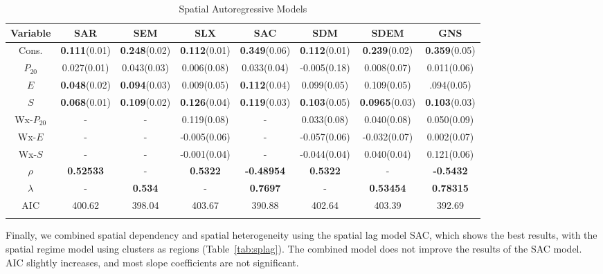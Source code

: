 \documentclass[
  manuscript=article,  
  layout=preprint,  
  year=2023,
  volume=0,
]{format}
\begin{document}
\begin{table}[htbp]\centering
\caption{Spatial Autoregressive Models}
\label{tab:SAR}
\begin{tabular}{c c c c c c c c}
\toprule
\textbf{Variable} & \textbf{SAR} & \textbf{SEM} & \textbf{SLX} & \textbf{SAC} & \textbf{SDM} & \textbf{SDEM} & \textbf{GNS}\\ 
\midrule
Cons.&\textbf{0.111}(0.01)&\textbf{0.248}(0.02)&\textbf{0.112}(0.01)&\textbf{0.349}(0.06)&\textbf{0.112}(0.01)&\textbf{0.239}(0.02)&\textbf{0.359}(0.05)  \\
$P_{20}$&0.027(0.01)&0.043(0.03)&0.006(0.08)&0.033(0.04)&-0.005(0.18)&0.008(0.07)&0.011(0.06) \\
$E$&\textbf{0.048}(0.02)&\textbf{0.094}(0.03)&0.009(0.05)&\textbf{0.112}(0.04)&0.099(0.05)&0.109(0.05)&.094(0.05) \\
$S$&\textbf{0.068}(0.01)&\textbf{0.109}(0.02)&\textbf{0.126}(0.04)&\textbf{0.119}(0.03)&\textbf{0.103}(0.05)&\textbf{0.0965}(0.03)&\textbf{0.103}(0.03) \\
Wx-$P_{20}$&-&-&0.119(0.08)&-&0.033(0.08)&0.040(0.08)&0.050(0.09) \\
Wx-$E$&-&-&-0.005(0.06)&-&-0.057(0.06)&-0.032(0.07)&0.002(0.07) \\
Wx-$S$&-&-&-0.001(0.04)&-&-0.044(0.04)&0.040(0.04)&0.121(0.06) \\
\midrule
$\rho$&\textbf{0.52533}&-&\textbf{0.5322}&\textbf{-0.48954}&\textbf{0.5322}&-&\textbf{-0.5432} \\
$\lambda$&-&\textbf{0.534}&-&\textbf{0.7697}&-&\textbf{0.53454}&\textbf{0.78315} \\
AIC&400.62&398.04&403.67&390.88&402.64&403.39&392.69   \\
\bottomrule
\addlinespace[1ex]
\multicolumn{3}{l}{\textbf{$p<0.05$}}
\end{tabular}
\end{table}

\par Finally, we combined spatial dependency and spatial heterogeneity using the spatial lag model SAC, which shows the best results, with the spatial regime model using clusters as regions (Table~\ref{tab:splag}). The combined model does not improve the results of the SAC model. AIC slightly increases, and most slope coefficients are not significant.
\end{document}
